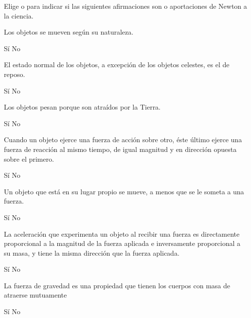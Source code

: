 Elige  o  para indicar si las siguientes afirmaciones son o  aportaciones de Newton a la ciencia.

\begin{parts}

    Los objetos se mueven según su naturaleza.

    \begin{oneparchoices}
        \choice Sí
        \choice No
    \end{oneparchoices}

    El estado normal de los objetos, a excepción de los objetos celestes, es el de reposo.

    \begin{oneparchoices}
        \choice Sí
        \choice No
    \end{oneparchoices}

    Los objetos pesan porque son atraídos por la Tierra.

    \begin{oneparchoices}
        \choice Sí
        \choice No
    \end{oneparchoices}

    Cuando un objeto ejerce una fuerza de acción sobre otro, éste último ejerce una fuerza de reacción al mismo tiempo, de igual magnitud y en dirección opuesta sobre el primero.

    \begin{oneparchoices}
        \choice Sí
        \choice No
    \end{oneparchoices}

    Un objeto que está en su lugar propio  se mueve, a menos que se le someta a una fuerza.

    \begin{oneparchoices}
        \choice Sí
        \choice No
    \end{oneparchoices}

    La aceleración que experimenta un objeto al recibir una fuerza es directamente proporcional a la magnitud de la fuerza aplicada e inversamente proporcional a su masa, y tiene la misma dirección que la fuerza aplicada.

    \begin{oneparchoices}
        \choice Sí
        \choice No
    \end{oneparchoices}

    La fuerza de gravedad es una propiedad que tienen los cuerpos con masa de atraerse mutuamente

    \begin{oneparchoices}
        \choice Sí
        \choice No
    \end{oneparchoices}


\end{parts}
